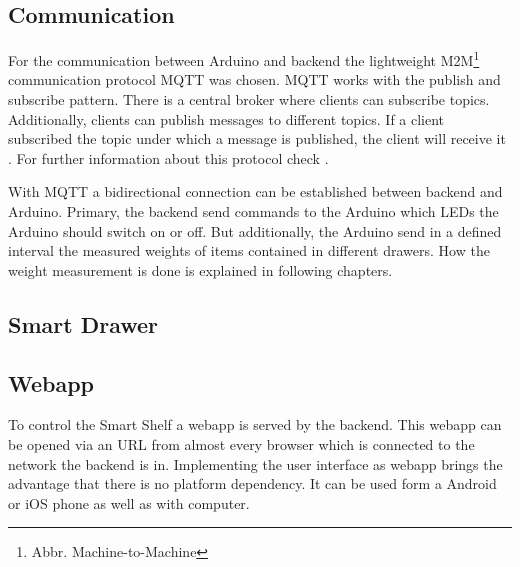\subsection{Communication}\label{sec:communciation}
For the communication between Arduino and backend the lightweight M2M\footnote{Abbr. Machine-to-Machine} communication protocol MQTT was chosen. 
MQTT works with the publish and subscribe pattern. 
There is a central broker where clients can subscribe topics. 
Additionally, clients can publish messages to different topics. 
If a client subscribed the topic under which a message is published, the client will receive it \cite{standard2014mqtt}. 
For further information about this protocol check \cite{standard2014mqtt}. 

With MQTT a bidirectional connection can be established between backend and Arduino. 
Primary, the backend send commands to the Arduino which LEDs the Arduino should switch on or off. 
But additionally, the Arduino send in a defined interval the measured weights of items contained in different drawers. 
How the weight measurement is done is explained in following chapters. 

\subsection{Smart Drawer}

\subsection{Webapp}
To control the Smart Shelf a webapp is served by the backend. 
This webapp can be opened via an URL from almost every browser which is connected to the network the backend is in. 
Implementing the user interface as webapp brings the advantage that there is no platform dependency. 
It can be used form a Android or iOS phone as well as with computer. 


